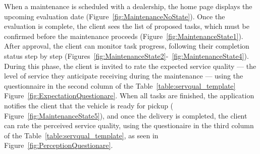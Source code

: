 


When a maintenance is scheduled with a dealership, the home page displays the upcoming evaluation date (Figure~\ref{fig:MaintenanceNoState}). Once the evaluation is complete, the client sees the list of proposed tasks, which must be confirmed before the maintenance proceeds (Figure~\ref{fig:MaintenanceState1}). After approval, the client can monitor task progress, following their completion status step by step (Figures~\ref{fig:MaintenanceState2}-~\ref{fig:MaintenanceState4}). During this phase, the client is invited to rate the expected service quality — the level of service they anticipate receiving during the maintenance — using the questionnaire in the second column of the Table~\ref{table:servqual_template} Figure~\ref{fig:ExpectationQuestionare}. When all tasks are finished, the application notifies the client that the vehicle is ready for pickup ( Figure~\ref{fig:MaintenanceState5}), and once the delivery is completed, the client can rate the perceived service quality, using the questionaire in the third column of the Table~\ref{table:servqual_template}, as seen in Figure~\ref{fig:PerceptionQuestionare}.

